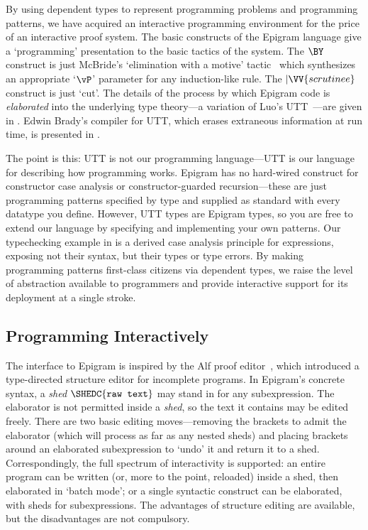 \documentclass{fundam}
\begin{document}
By using dependent types to represent programming problems and
programming patterns, we have acquired an interactive programming
environment for the price of an interactive proof system. The basic
constructs of the Epigram language give a `programming' presentation
to the basic tactics of the system. The $\BY$ construct is just
McBride's `elimination with a motive' tactic~\cite{conor:motive} which
synthesizes an appropriate `$\vP$' parameter for any induction-like
rule. The $|\VV{scrutinee}$ construct is just `cut'.
%
The details of the process by which Epigram code is \emph{elaborated}
into the underlying type theory---a variation of Luo's
UTT~\cite{luo:typetheoryforcs}---are given in
\cite{ConorJames:vfl}. Edwin Brady's compiler for UTT,
which erases extraneous information at run time, is presented
in \cite{edwin:thesis}.

The point is this: UTT is not our programming language---UTT is our
language for describing how programming works.  Epigram has no
hard-wired construct for constructor case analysis or
constructor-guarded recursion---these are just programming patterns
specified by type and supplied as standard with every datatype you
define. However, UTT types are Epigram types, so you are free to
extend our language by specifying and implementing your own
patterns. Our typechecking example in \cite{ConorJames:vfl} is a
derived case analysis principle for expressions, exposing not their
syntax, but their types or type errors. By making programming patterns
first-class citizens via dependent types, we raise the level of
abstraction available to programmers and provide interactive support for its
deployment at a single stroke.


\subsection{Programming Interactively}

The interface to Epigram is inspired by the Alf
proof editor~\cite{magnusson.nordstrom:alf}, which introduced
a type-directed structure editor for incomplete programs.
In Epigram's  concrete syntax, a \emph{shed} $\SHEDC{\texttt{raw
text}}$ may stand in for any subexpression. The elaborator is not
permitted inside a \emph{shed}, so the text it contains may be edited
freely.  There are two basic editing moves---removing the brackets to
admit the elaborator (which will process as far as any nested sheds)
and placing brackets around an elaborated subexpression to `undo' it
and return it to a shed. Correspondingly, the full spectrum of
interactivity is supported: an entire program can be written (or, more
to the point, reloaded) inside a shed, then elaborated in `batch
mode'; or a single syntactic construct can be elaborated, with sheds
for subexpressions. The advantages of structure editing are available,
but the disadvantages are not compulsory.
\end{document}
